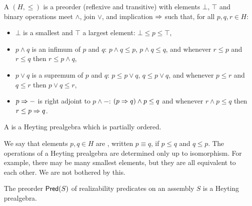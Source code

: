 \begin{definition}
  A  $(H, {\leq})$ is a preorder (reflexive
  and transitive) with elements $\bot$, $\top$ and binary operations
  meet $\land$, join $\lor$, and implication $\Rightarrow$ such that, for all
  $p, q, r \in H$:
  \begin{itemize}
  \item $\bot$ is a smallest and $\top$ a largest element: $\bot \leq
    p \leq \top$,
  \item $p \land q$ is an infimum of $p$ and $q$: $p \land q \leq p$,
    $p \land q \leq q$, and whenever $r \leq p$ and $r \leq q$ then $r
    \leq p \land q$,
  \item $p \lor q$ is a supremum of $p$ and $q$: $p \leq p \lor q$, $q
    \leq p \lor q$, and whenever $p \leq r$ and $q \leq r$ then $p
    \lor q \leq r$,
  \item $p \Rightarrow {-}$ is right adjoint to $p \land {-}$: $(p \Rightarrow q)
    \land p \leq q$ and whenever $r \land p \leq q$ then $r \leq p
    \Rightarrow q$.
  \end{itemize}
  A  is a Heyting prealgebra which is partially
  ordered.
\end{definition}

We say that elements $p, q \in H$ are , written $p
\equiv q$, if $p \leq q$ and $q \leq p$. The operations of a Heyting
prealgebra are determined only up to isomorphism. For example, there
may be many smallest elements, but they are all equivalent to each
other. We are not bothered by this.

\begin{proposition}
  The preorder $\mathsf{Pred}(S)$ of realizability predicates on an
  assembly $S$ is a Heyting prealgebra.
\end{proposition}

